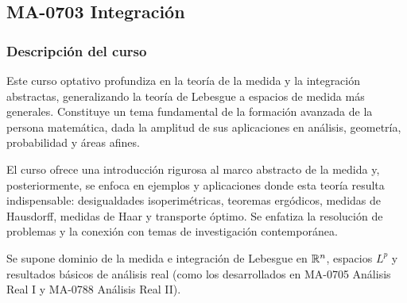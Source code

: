 \newpage
\subsection*{MA-0703 Integración}

\hypertarget{MA0703}{}
\begin{refsection}
\begin{table}[H]
\end{table}

\subsubsection*{Descripción del curso}

Este curso optativo profundiza en la teoría de la medida y la integración abstractas, generalizando la teoría de Lebesgue a espacios de medida más generales. Constituye un tema fundamental de la formación avanzada de la persona matemática, dada la amplitud de sus aplicaciones en análisis, geometría, probabilidad y áreas afines.

El curso ofrece una introducción rigurosa al marco abstracto de la medida y, posteriormente, se enfoca en ejemplos y aplicaciones donde esta teoría resulta indispensable: desigualdades isoperimétricas, teoremas ergódicos, medidas de Hausdorff, medidas de Haar y transporte óptimo. Se enfatiza la resolución de problemas y la conexión con temas de investigación contemporánea.

Se supone dominio de la medida e integración de Lebesgue en $\mathbb{R}^n$, espacios $L^p$ y resultados básicos de análisis real (como los desarrollados en MA-0705 Análisis Real I y MA-0788 Análisis Real II).


\end{refsection}

